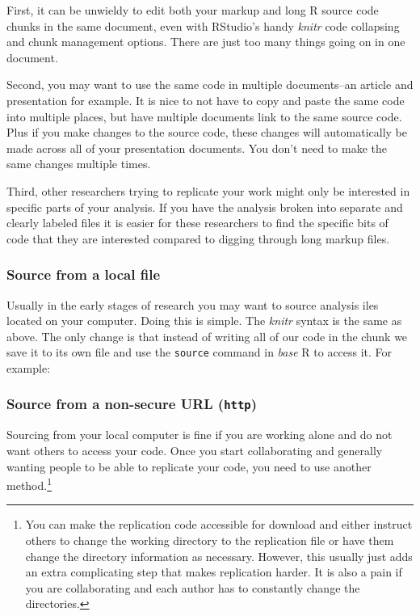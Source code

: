 \documentclass[ChapterTOCs,krantz1]{krantz}\usepackage{graphicx, color}
\begin{document}
First, it can be unwieldy to edit both your markup and long R source code chunks in the same document, even with RStudio's handy {\emph{knitr}} code collapsing and chunk management options. There are just too many things going on in one document.

Second, you may want to use the same code in multiple documents--an
article and presentation for example. It is nice to not have to copy and
paste the same code into multiple places, but have multiple documents
link to the same source code. Plus if you make changes to the source
code, these changes will automatically be made across all of your
presentation documents. You don't need to make the same changes multiple
times.

Third, other researchers trying to replicate your work might only be
interested in specific parts of your analysis. If you have the analysis
broken into separate and clearly labeled files it is easier for these
researchers to find the specific bits of code that they are interested
compared to digging through long markup files.

\subsubsection{Source from a local file}

Usually in the early stages of research you may want to source analysis iles located on your computer. Doing this is simple. The {\emph{knitr}} syntax is the same as above. The only change is that instead of writing all of our code in the chunk we save it to its own file and use the \texttt{source} command in \emph{base} R to access it. For example:

\subsubsection{Source from a non-secure URL (\texttt{http})}

Sourcing from your local computer is fine if you are working alone and do not want others to access your code. Once you start collaborating and generally wanting people to be able to replicate your code, you need to
use another method.\footnote{You can make the replication code accessible for download and either instruct others to change the working directory to the replication file or have them change the directory information as necessary. However, this usually just adds an extra complicating step that makes replication harder. It is also a   pain if you are collaborating and each author has to constantly change the directories.}
\end{document}
